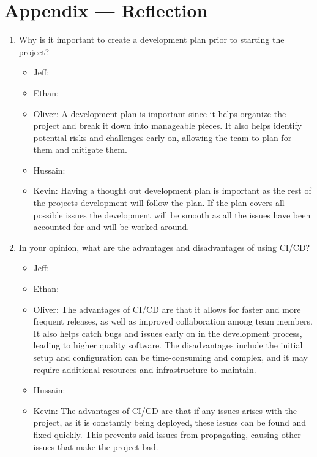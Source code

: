 \documentclass{article}
\begin{document}
\newpage{}

\section*{Appendix --- Reflection}




\begin{enumerate}
    \item Why is it important to create a development plan prior to starting the
    project?
	\begin{itemize}
		\item Jeff:
		\item Ethan:
		\item Oliver: A development plan is important since it helps organize 
    the project and break it down into manageable pieces. It also helps 
    identify potential risks and challenges early on, allowing the team 
    to plan for them and mitigate them. 
		\item Hussain:
		\item Kevin: Having a thought out development plan is important as the 
        rest of the projects development will follow the plan. If the plan 
        covers all possible issues the development will be smooth as all the 
        issues have been accounted for and will be worked around. 
	\end{itemize}
    \item In your opinion, what are the advantages and disadvantages of using
    CI/CD?
	\begin{itemize}
		\item Jeff:
		\item Ethan:
		\item Oliver: The advantages of CI/CD are that it allows for 
    faster and more frequent releases, as well as improved collaboration 
    among team members. It also helps catch bugs and issues early on in the 
    development process, leading to higher quality software. The disadvantages 
    include the initial setup and configuration can be time-consuming and 
    complex, and it may require additional resources and infrastructure to 
    maintain.
		\item Hussain:
		\item Kevin: The advantages of CI/CD are that if any issues arises with 
        the project, as it is constantly being deployed, these issues can be 
        found and fixed quickly. This prevents said issues from propagating, 
        causing other issues that make the project bad.
		

\end{itemize}
\end{enumerate}
\end{document}

